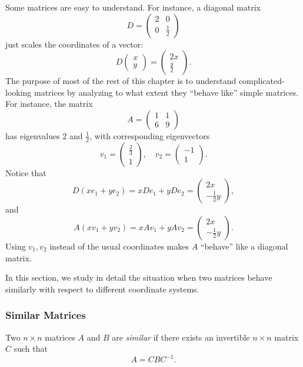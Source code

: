 \documentclass[a4paper,12pt]{article}
\begin{document}
Some matrices are easy to understand. For instance, a diagonal matrix 
\[
D = \begin{pmatrix} 2 & 0 \\ 0 & \frac{1}{2} \end{pmatrix}
\]
just scales the coordinates of a vector:
\[
D \begin{pmatrix} x \\ y \end{pmatrix} = \begin{pmatrix} 2x \\ \frac{y}{2} \end{pmatrix}.
\]
The purpose of most of the rest of this chapter is to understand complicated-looking matrices by analyzing to what extent they “behave like” simple matrices. For instance, the matrix
\[
A = \begin{pmatrix} 1 & 1 \\ 6 & 9 \end{pmatrix}
\]
has eigenvalues \(2\) and \(\frac{1}{2}\), with corresponding eigenvectors 
\[
v_1 = \begin{pmatrix} \frac{2}{3} \\ 1 \end{pmatrix}, \quad v_2 = \begin{pmatrix} -1 \\ 1 \end{pmatrix}.
\]
Notice that
\[
D(xe_1 + ye_2) = xDe_1 + yDe_2 = \begin{pmatrix} 2x \\ -\frac{1}{2}y \end{pmatrix},
\]
and
\[
A(xv_1 + yv_2) = xAv_1 + yAv_2 = \begin{pmatrix} 2x \\ -\frac{1}{2}y \end{pmatrix}.
\]
Using \(v_1, v_2\) instead of the usual coordinates makes \(A\) “behave” like a diagonal matrix.

In this section, we study in detail the situation when two matrices behave similarly with respect to different coordinate systems.

\subsubsection{Similar Matrices}
        \begin{tcolorbox}[title=Definition,colframe=blue!70!black, colback=blue!5!white]
    Two \(n \times n\) matrices \(A\) and \(B\) are \textit{similar} if there exists an invertible \(n \times n\) matrix \(C\) such that 
\[
A = C B C^{-1}.
\]

        \end{tcolorbox}
\end{document}
